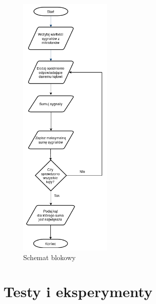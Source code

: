 \documentclass[eng,printmode]{mgr}
\begin{document}
\begin{figure}[ht]

    \centering

  \includegraphics[width=0.4\textwidth, angle=0]{blokowy.png}

    \caption{Schemat blokowy}
 \label{fig-schemblok}
    

\end{figure}


\chapter{Testy i eksperymenty}
\end{document}
